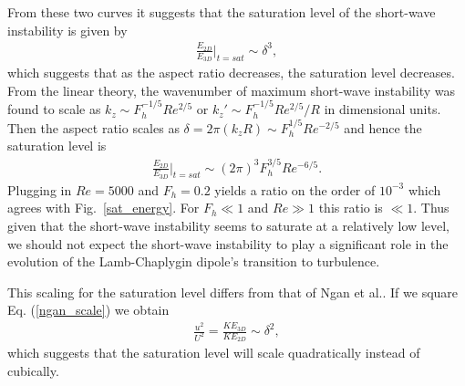From these two curves it suggests that the saturation level of the short-wave instability is given by
\begin{align}
\frac{E_{2D}}{E_{3D}}\bigg|_{t=sat} \sim \delta^{3},
\end{align}
which suggests that as the aspect ratio decreases, the saturation level decreases. From the linear theory, the wavenumber of maximum short-wave instability was found to scale as $k_{z}\sim F_{h}^{-1/5}Re^{2/5}$ or $k_{z}'\sim F_{h}^{-1/5}Re^{2/5}/R$ in dimensional units. Then the aspect ratio scales as $\delta = 2\pi(k_{z}R) \sim F_{h}^{1/5}Re^{-2/5}$ and hence the saturation level is 
\begin{align}
\frac{E_{2D}}{E_{3D}}\bigg|_{t=sat} \sim (2\pi)^{3}F_{h}^{3/5}Re^{-6/5}.
\end{align}
Plugging in $Re=5000$ and $F_{h}=0.2$ yields a ratio on the order of $10^{-3}$ which agrees with Fig.~\ref{sat_energy}. For $F_{h}\ll 1$ and $Re\gg 1$ this ratio is $\ll 1$. Thus given that the short-wave instability seems to saturate at a relatively low level, we should not expect the short-wave instability to play a significant role in the evolution of the Lamb-Chaplygin dipole's transition to turbulence. 

This scaling for the saturation level differs from that of Ngan et al.\cite{ngan2005}. If we square Eq. (\ref{ngan_scale}) we obtain 
\begin{align}
\frac{u^{2}}{U^{2}} =\frac{KE_{3D}}{KE_{2D}}\sim \delta^{2},
\end{align}
which suggests that the saturation level will scale quadratically instead of cubically. %


